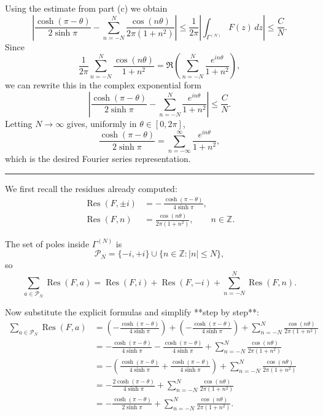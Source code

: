 \documentclass[12pt,a4paper]{article}
\theoremstyle{plain}
\theoremstyle{definition}
\theoremstyle{remark}
\theoremstyle{remark}
\DeclareMathOperator{\Res}{Res}
\begin{document}
Using the estimate from part (c) we obtain
\[
\left|
\frac{\cosh(\pi-\theta)}{2\sinh\pi}
-\sum_{n=-N}^N \frac{\cos(n\theta)}{2\pi(1+n^2)}
\right|
\le \frac{1}{2\pi}
\left|\int_{\Gamma^{(N)}} F(z)\,dz\right|
\le \frac{C}{N}.
\]
Since
\[
\frac{1}{2\pi}\sum_{n=-N}^N \frac{\cos(n\theta)}{1+n^2}
= \Re\left(\sum_{n=-N}^N \frac{e^{in\theta}}{1+n^2}\right),
\]
we can rewrite this in the complex exponential form
\[
\left|
\frac{\cosh(\pi-\theta)}{2\sinh\pi}
-\sum_{n=-N}^N \frac{e^{in\theta}}{1+n^2}
\right|
\le \frac{C}{N}.
\]
Letting $N\to\infty$ gives, uniformly in $\theta\in[0,2\pi]$,
\[
\frac{\cosh(\pi-\theta)}{2\sinh\pi}
=\sum_{n=-\infty}^{\infty} \frac{e^{in\theta}}{1+n^2},
\]
which is the desired Fourier series representation.
\qedhere

\bigskip
\noindent\rule{\textwidth}{0.4pt}
\medskip

We first recall the residues already computed:
\begin{align*}
	\Res(F,\pm i) &= -\,\frac{\cosh(\pi-\theta)}{4\sinh\pi},\\[4pt]
	\Res(F,n) &= \frac{\cos(n\theta)}{2\pi(1+n^2)}, \qquad n\in\mathbb{Z}.
\end{align*}

The set of poles inside $\Gamma^{(N)}$ is
\[
\mathcal{P}_N = \{-i,+i\}\cup\{n\in\mathbb{Z}:|n|\le N\},
\]
so
\begin{equation*}
	\sum_{a\in\mathcal{P}_N} \Res(F,a)
	= \Res(F,i)+\Res(F,-i)+\sum_{n=-N}^{N}\Res(F,n).
\end{equation*}

Now substitute the explicit formulas and simplify **step by step**:
\begin{align*}
	\sum_{a\in\mathcal{P}_N} \Res(F,a)
	&= \left(-\frac{\cosh(\pi-\theta)}{4\sinh\pi}\right)
	+\left(-\frac{\cosh(\pi-\theta)}{4\sinh\pi}\right)
	+\sum_{n=-N}^{N}\frac{\cos(n\theta)}{2\pi(1+n^2)}\\[6pt]
	&= -\frac{\cosh(\pi-\theta)}{4\sinh\pi}
	-\frac{\cosh(\pi-\theta)}{4\sinh\pi}
	+\sum_{n=-N}^{N}\frac{\cos(n\theta)}{2\pi(1+n^2)}\\[6pt]
	&= -\left(
	\frac{\cosh(\pi-\theta)}{4\sinh\pi}
	+\frac{\cosh(\pi-\theta)}{4\sinh\pi}
	\right)
	+\sum_{n=-N}^{N}\frac{\cos(n\theta)}{2\pi(1+n^2)}\\[6pt]
	&= -\frac{2\cosh(\pi-\theta)}{4\sinh\pi}
	+\sum_{n=-N}^{N}\frac{\cos(n\theta)}{2\pi(1+n^2)}\\[6pt]
	&= -\frac{\cosh(\pi-\theta)}{2\sinh\pi}
	+\sum_{n=-N}^{N}\frac{\cos(n\theta)}{2\pi(1+n^2)}.
\end{align*}
\end{document}
